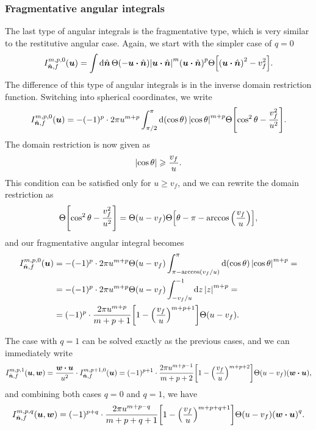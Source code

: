 \documentclass[aps,prl,preprint,groupedaddress,10pt]{revtex4-2}
\begin{document}
\subsubsection{Fragmentative angular integrals}
The last type of angular integrals is the fragmentative type, which is very
similar to the restitutive angular case. Again, we start with the simpler case of
$q=0$
\begin{equation}
    I_{\bn,f}^{m,p,0}\pqty{\bu}=\int\dd{\bn}\Theta\pqty{-\bu\vdot\bn}
    \abs{\bu\vdot\bn}^m\pqty{\bu\vdot\bn}^p
    \Theta\bqty{\pqty{\bu\vdot\bn}^2-v_f^2}.
\end{equation}
The difference of this type of angular integrals is in the inverse domain restriction
function. Switching into spherical coordinates, we write
\begin{equation}
    I_{\bn,f}^{m,p,0}\pqty{\bu}=-(-1)^p\cdot 2\pi u^{m+p}\int_{\pi/2}^{\pi}
    \dd{\pqty{\cos\theta}}\abs{\cos\theta}^{m+p}
    \Theta\bqty{\cos^2\theta-\frac{v_f^2}{u^2}}.
\end{equation}
The domain restriction is now given as
\begin{equation}
    \abs{\cos\theta}\geqslant\frac{v_f}{u}.
\end{equation}
This condition can be satisfied only for $u\geqslant v_f$, and we can rewrite
the domain restriction as
\begin{equation}
    \Theta\bqty{\cos^2\theta-\frac{v_f^2}{u^2}}=
    \Theta\pqty{u-v_f}\Theta\bqty{\theta-\pi-\arccos\pqty{\frac{v_f}{u}}},
\end{equation}
and our fragmentative angular integral becomes
\begin{equation}
    \begin{split}
        I_{\bn,f}^{m,p,0}\pqty{\bu}&=-(-1)^p\cdot 2\pi u^{m+p}\Theta\pqty{u-v_f}
        \int_{\pi-\arccos(v_f/u)}^{\pi}\dd{\pqty{\cos\theta}}\abs{\cos\theta}^{m+p}=\\
        &=-(-1)^p\cdot 2\pi u^{m+p}\Theta\pqty{u-v_f}
        \int_{-v_f/u}^{-1}\dd{z}\abs{z}^{m+p}=\\
        &=(-1)^p\cdot\frac{2\pi u^{m+p}}{m+p+1}\bqty{1-\pqty{\frac{v_f}{u}}^{m+p+1}}
        \Theta\pqty{u-v_f}.
    \end{split}
\end{equation}

The case with $q=1$ can be solved exactly as the previous cases, and we can immediately
write
\begin{equation}
    I_{\bn,f}^{m,p,1}(\bu,\bw)=\frac{\bw\vdot\bu}{u^2}\cdot I_{\bn,f}^{m,p+1,0}(\bu)=
    (-1)^{p+1}\cdot\frac{2\pi u^{m+p-1}}{m+p+2}\bqty{1-\pqty{\frac{v_f}{u}}^{m+p+2}}
    \Theta\pqty{u-v_f}\pqty{\bw\vdot\bu},
\end{equation}
and combining both cases $q=0$ and $q=1$, we have
\begin{equation}
    I_{\bn,f}^{m,p,q}(\bu,\bw)=(-1)^{p+q}\cdot\frac{2\pi u^{m+p-q}}{m+p+q+1}
    \bqty{1-\pqty{\frac{v_f}{u}}^{m+p+q+1}}
    \Theta\pqty{u-v_f}\pqty{\bw\vdot\bu}^q.
\end{equation}
\end{document}
